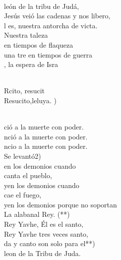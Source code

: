\begin{cancion}%
	     \chord{(}{**)}{    }\\
	león de la tribu de Judá,\\
	Jesús veió las cadenas y nos libero,\\
	l es, nuestra antorcha de victa.\\
	Nuestra taleza \\
en tiempos de flaqueza \\
	una tre en tiempos de guerra\\
	, la espera de Isra\\\jump\\
	\begin{chorus}%
	Rcito, resucit \\
	Resucito,leluya. )\\
	\end{chorus}%
	\jump\\
	ció a la muerte con poder.\\
	nció a la muerte con poder.\\
	ncio a la muerte con poder.\\
	Se levantó2) \\
	en los demonios cuando \\
canta el pueblo,\\
	yen los demonios cuando \\
cae el fuego,\\
	yen los demonios porque no soportan\\
	La alabanal Rey. (**)\\
	 Rey Yavhe, Él es el santo,\\
	 Rey Yavhe tres veces santo,\\
	da y canto son solo para el**)\\
	leon de la Tribu de Juda.\\
\end{cancion}%
